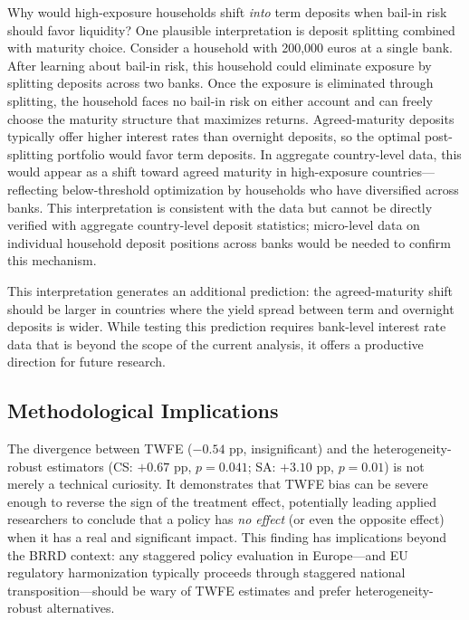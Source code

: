\documentclass[12pt]{article}
\begin{document}
Why would high-exposure households shift \textit{into} term deposits when bail-in risk should favor liquidity? One plausible interpretation is deposit splitting combined with maturity choice. Consider a household with 200{,}000 euros at a single bank. After learning about bail-in risk, this household could eliminate exposure by splitting deposits across two banks. Once the exposure is eliminated through splitting, the household faces no bail-in risk on either account and can freely choose the maturity structure that maximizes returns. Agreed-maturity deposits typically offer higher interest rates than overnight deposits, so the optimal post-splitting portfolio would favor term deposits. In aggregate country-level data, this would appear as a shift toward agreed maturity in high-exposure countries---reflecting below-threshold optimization by households who have diversified across banks. This interpretation is consistent with the data but cannot be directly verified with aggregate country-level deposit statistics; micro-level data on individual household deposit positions across banks would be needed to confirm this mechanism.

This interpretation generates an additional prediction: the agreed-maturity shift should be larger in countries where the yield spread between term and overnight deposits is wider. While testing this prediction requires bank-level interest rate data that is beyond the scope of the current analysis, it offers a productive direction for future research.

\subsection{Methodological Implications}

The divergence between TWFE ($-0.54$ pp, insignificant) and the heterogeneity-robust estimators (CS: $+0.67$ pp, $p = 0.041$; SA: $+3.10$ pp, $p = 0.01$) is not merely a technical curiosity. It demonstrates that TWFE bias can be severe enough to reverse the sign of the treatment effect, potentially leading applied researchers to conclude that a policy has \textit{no effect} (or even the opposite effect) when it has a real and significant impact. This finding has implications beyond the BRRD context: any staggered policy evaluation in Europe---and EU regulatory harmonization typically proceeds through staggered national transposition---should be wary of TWFE estimates and prefer heterogeneity-robust alternatives.
\end{document}
